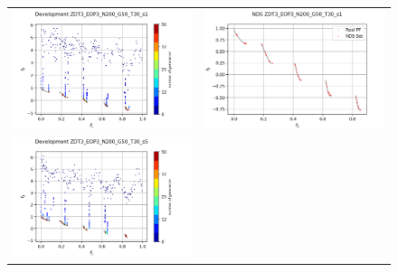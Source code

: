 \begin{figure}[H]
    \centering
    \begin{tabular}{c c}
    \includegraphics[scale=0.5]{figures/ZDT3_EOP3_N200_G50_T30/s1_dev.png} &
    \includegraphics[scale=0.5]{figures/ZDT3_EOP3_N200_G50_T30/s1_nds.png}\\
    \includegraphics[scale=0.5]{figures/ZDT3_EOP3_N200_G50_T30/s5_dev.png} &

\end{tabular}
\end{figure}
